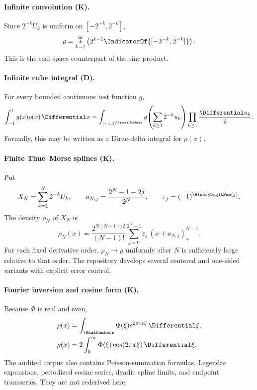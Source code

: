 \documentclass[11pt]{article}
\theoremstyle{definition}
\theoremstyle{remark}
\newcommand{\eps}{\varepsilon}
\newcommand{\statusknown}{\textsf{K}}
\newcommand{\statusderived}{\textsf{D}}
\begin{document}
\paragraph{Infinite convolution (\statusknown).}
Since \(2^{-k}U_k\) is uniform on \([-2^{-k},2^{-k}]\),
\begin{equation}
 \rho=\mathop{\ast}_{k=1}^{\infty}
 \left(2^{k-1}\IndicatorOf{[-2^{-k},2^{-k}]}\right).        \label{p1:eq:rho-convolution}
\end{equation}
This is the real-space counterpart of the sinc product.

\paragraph{Infinite cube integral (\statusderived).}
For every bounded continuous test function \(g\),
\begin{equation}
 \int_{-1}^{1}g(x)\rho(x)\,\Differential x
 =\int_{[-1,1]^{\NaturalNumbers}}g\!\left(\sum_{k\ge1}2^{-k}u_k\right)
   \prod_{k\ge1}\frac{\Differential u_k}{2}.                           \label{p1:eq:cube-pushforward}
\end{equation}
Formally, this may be written as a Dirac-delta integral for \(\rho(x)\).

\paragraph{Finite Thue--Morse splines (\statusknown).}
Put
\begin{equation}
 X_N=\sum_{k=1}^{N}2^{-k}U_k,
 \qquad
 a_{N,j}=\frac{2^N-1-2j}{2^N},
 \qquad
 \eps_j=(-1)^{\BinaryDigitSum(j)}.                                      \label{p1:eq:aNj}
\end{equation}
The density \(\rho_N\) of \(X_N\) is
\begin{equation}
 \rho_N(x)=\frac{2^{N(N-1)/2}}{(N-1)!}
 \sum_{j=0}^{2^N-1}\eps_j\,(x+a_{N,j})_+^{N-1}.             \label{p1:eq:finite-spline}
\end{equation}
For each fixed derivative order, \(\rho_N\to\rho\) uniformly after \(N\) is sufficiently
large relative to that order.  The repository develops several centered and one-sided
variants with explicit error control.

\paragraph{Fourier inversion and cosine form (\statusknown).}
Because \(\Phi\) is real and even,
\begin{align}
 \rho(x)&=\int_{\RealNumbers}\Phi(\xi)e^{2\pi i x\xi}\,\Differential\xi,
                                                                  \label{p1:eq:rho-fourier-inversion}\\
 \rho(x)&=2\int_0^{\infty}\Phi(\xi)\cos(2\pi x\xi)\,\Differential\xi.
                                                                  \label{p1:eq:rho-cosine}
\end{align}
The audited corpus also contains Poisson-summation formulas, Legendre expansions,
periodized cosine series, dyadic spline limits, and endpoint transseries.  They are not
rederived here.
\end{document}
